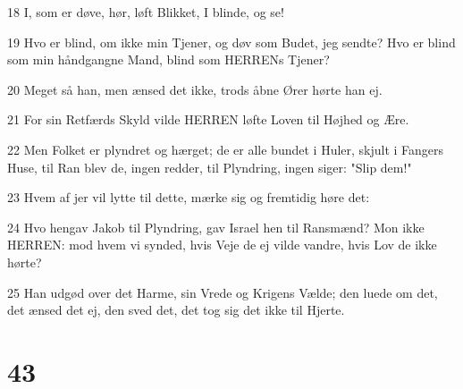 \par 18 I, som er døve, hør, løft Blikket, I blinde, og se!
\par 19 Hvo er blind, om ikke min Tjener, og døv som Budet, jeg sendte? Hvo er blind som min håndgangne Mand, blind som HERRENs Tjener?
\par 20 Meget så han, men ænsed det ikke, trods åbne Ører hørte han ej.
\par 21 For sin Retfærds Skyld vilde HERREN løfte Loven til Højhed og Ære.
\par 22 Men Folket er plyndret og hærget; de er alle bundet i Huler, skjult i Fangers Huse, til Ran blev de, ingen redder, til Plyndring, ingen siger: "Slip dem!"
\par 23 Hvem af jer vil lytte til dette, mærke sig og fremtidig høre det:
\par 24 Hvo hengav Jakob til Plyndring, gav Israel hen til Ransmænd? Mon ikke HERREN: mod hvem vi synded, hvis Veje de ej vilde vandre, hvis Lov de ikke hørte?
\par 25 Han udgød over det Harme, sin Vrede og Krigens Vælde; den luede om det, det ænsed det ej, den sved det, det tog sig det ikke til Hjerte.

\chapter{43}

